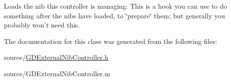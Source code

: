 Loads the nib this controller is managing. This is a hook you can use to do something after the nibs have loaded, to \char`\"{}prepare\char`\"{} them; but generally you probably won't need this. 

The documentation for this class was generated from the following files:\begin{DoxyCompactItemize}
\item 
source/\hyperlink{_g_d_external_nib_controller_8h}{GDExternalNibController.h}\item 
source/GDExternalNibController.m\end{DoxyCompactItemize}
